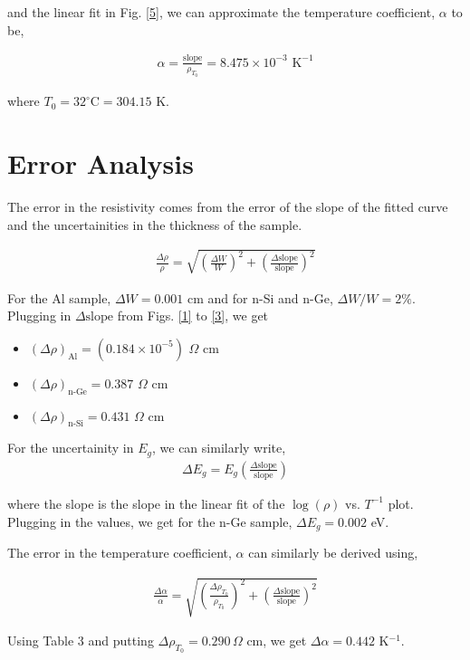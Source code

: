 \noindent and the linear fit in Fig. \ref{5}, we can approximate the temperature coefficient, $\alpha$ to be,

\begin{align*}
    \alpha = \frac{\text{slope}}{\rho_{T_0}} = 8.475 \times 10^{-3} \text{ K}^{-1}
\end{align*}

\noindent where $T_0=32^\circ$C$=304.15$ K.

\section{Error Analysis}
The error in the resistivity comes from the error of the slope of the fitted curve and the uncertainities in the thickness of the sample.

\begin{align}
    \frac{\Delta \rho}{\rho} = \sqrt{\left(\frac{\Delta W}{W}\right)^2 + \left(\frac{\Delta \text{slope}}{\text{slope}}\right)^2}
\end{align}

For the Al sample, $\Delta W = 0.001$ cm and for n-Si and n-Ge, $\Delta W/W = 2\%$. Plugging in $\Delta \text{slope}$ from Figs. \ref{1} to \ref{3}, we get

\begin{itemize}
    \item $(\Delta \rho)_\text{Al} = (0.184 \times 10^{-5})\,\,\Omega$ cm 
    \item $(\Delta \rho)_\text{n-Ge} = 0.387\,\,\Omega$ cm 
    \item $(\Delta \rho)_\text{n-Si} = 0.431\,\,\Omega$ cm 
\end{itemize}

\noindent For the uncertainity in $E_g$, we can similarly write,
\begin{align}
    \Delta E_g = E_g\left(\frac{\Delta \text{slope}}{\text{slope}}\right)
\end{align}

\noindent where the slope is the slope in the linear fit of the $\log(\rho)$ vs. $T^{-1}$ plot. Plugging in the values, we get for the n-Ge sample, $\Delta E_g=0.002$ eV.

The error in the temperature coefficient, $\alpha$ can similarly be derived using,

\begin{align}
    \frac{\Delta \alpha}{\alpha} = \sqrt{\left(\frac{\Delta \rho_{T_0}}{\rho_{T_0}}\right)^2 + \left(\frac{\Delta \text{slope}}{\text{slope}}\right)^2}
\end{align}

\noindent Using Table 3 and putting $\Delta \rho_{T_0}=0.290\,\Omega$ cm, we get $\Delta \alpha = 0.442$ K$^{-1}$.


